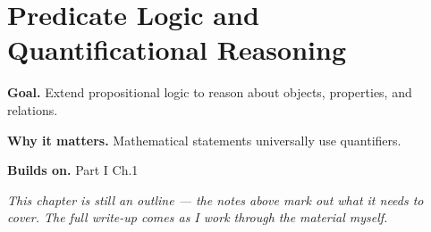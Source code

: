 \chapter{Predicate Logic and Quantificational Reasoning}
\label{ch:01-mathematical-logic-and-proof-theory-02}

\begin{chapterintro}
\textbf{Goal.} Extend propositional logic to reason about objects, properties, and relations.

\textbf{Why it matters.} Mathematical statements universally use quantifiers.

\textbf{Builds on.} Part I Ch.1
\end{chapterintro}

\textit{This chapter is still an outline --- the notes above mark out what it needs to cover. The full write-up comes as I work through the material myself.}
